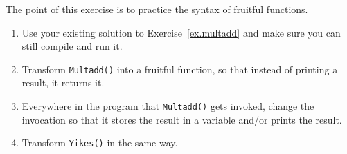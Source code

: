\begin{exercise}
The point of this exercise is to practice the syntax of fruitful
functions.

\begin{enumerate}

\item Use your existing solution to Exercise~\ref{ex.multadd} and make sure
you can still compile and run it.

\item Transform {\tt Multadd()} into a fruitful function, so
that instead of printing a result, it returns it.

\item Everywhere in the program that {\tt Multadd()} gets
invoked, change the invocation so that it stores the
result in a variable and/or prints the result.

\item Transform {\tt Yikes()} in the same way.

\end{enumerate}
\end{exercise}

